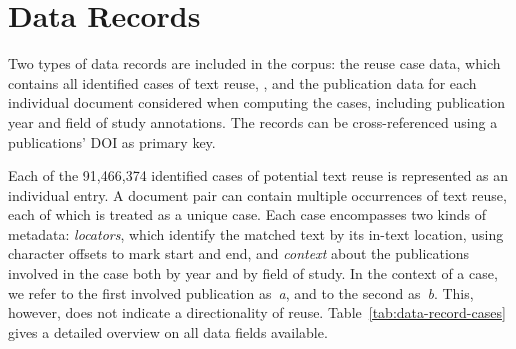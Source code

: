 \section*{Data Records}



Two types of data records are included in the \webisReuseCorpus corpus: the reuse case data, which contains all identified cases of text reuse, , and the publication data for each individual document considered when computing the cases, including publication year and field of study annotations. The records can be cross-referenced using a publications' DOI as primary key.

Each of the 91,466,374 identified cases of potential text reuse is represented as an individual entry. A document pair can contain multiple occurrences of text reuse, each of which is treated as a unique case. Each case encompasses two kinds of metadata:
\Ni
\textit{locators}, which identify the matched text by its in-text location, using character offsets to mark start and end, and
\Nii
\textit{context} about the publications involved in the case both by year and by field of study.
In the context of a case, we refer to the first involved publication as~\textit{a}, and to the second as~\textit{b}. This, however, does not indicate a directionality of reuse. Table~\ref{tab:data-record-cases} gives a detailed overview on all data fields available.

